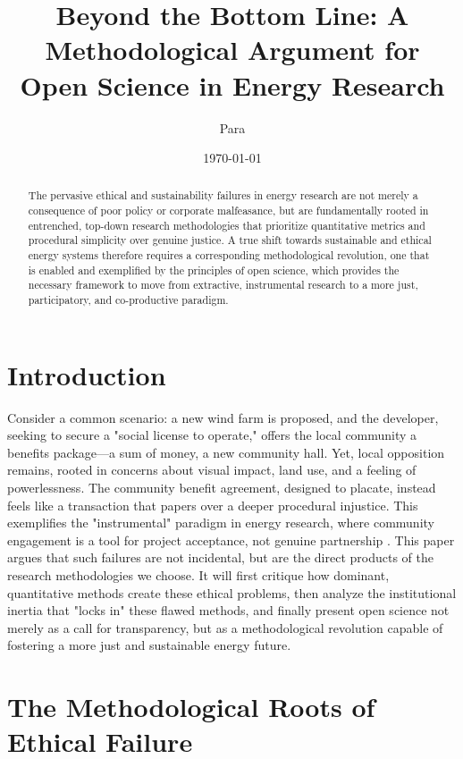 \documentclass[11pt, letterpaper, twocolumn]{article}
\title{\textbf{Beyond the Bottom Line: A Methodological Argument for Open Science in Energy Research}}
\author{Para}
\date{\today}
\begin{document}
\maketitle

\begin{abstract}
\noindent The pervasive ethical and sustainability failures in energy research are not merely a consequence of poor policy or corporate malfeasance, but are fundamentally rooted in entrenched, top-down research methodologies that prioritize quantitative metrics and procedural simplicity over genuine justice. A true shift towards sustainable and ethical energy systems therefore requires a corresponding methodological revolution, one that is enabled and exemplified by the principles of open science, which provides the necessary framework to move from extractive, instrumental research to a more just, participatory, and co-productive paradigm.
\end{abstract}

\section{Introduction}

Consider a common scenario: a new wind farm is proposed, and the developer, seeking to secure a "social license to operate," offers the local community a benefits package---a sum of money, a new community hall. Yet, local opposition remains, rooted in concerns about visual impact, land use, and a feeling of powerlessness. The community benefit agreement, designed to placate, instead feels like a transaction that papers over a deeper procedural injustice. This exemplifies the "instrumental" paradigm in energy research, where community engagement is a tool for project acceptance, not genuine partnership \citep{eisenson_webb_2023}. This paper argues that such failures are not incidental, but are the direct products of the research methodologies we choose. It will first critique how dominant, quantitative methods create these ethical problems, then analyze the institutional inertia that "locks in" these flawed methods, and finally present open science not merely as a call for transparency, but as a methodological revolution capable of fostering a more just and sustainable energy future.

\section{The Methodological Roots of Ethical Failure}
\end{document}

